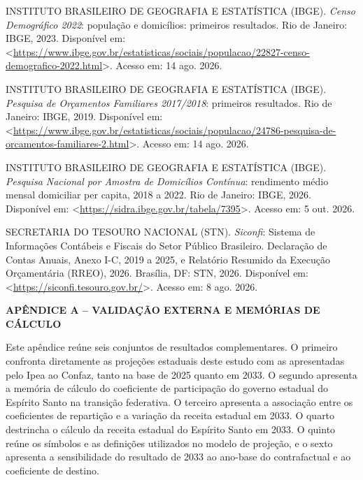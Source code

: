 \documentclass[12pt,a4paper]{article}
\renewcommand{\arraystretch}{1.15}
\newcommand{\tituloscentral}[1]{\par\vspace{18pt}\begin{center}\bfseries\MakeUppercase{#1}\end{center}\vspace{6pt}\nopagebreak}
\begin{document}
INSTITUTO BRASILEIRO DE GEOGRAFIA E ESTATÍSTICA (IBGE). \textit{Censo Demográfico 2022}: população e domicílios: primeiros resultados. Rio de Janeiro: IBGE, 2023. Disponível em: <\url{https://www.ibge.gov.br/estatisticas/sociais/populacao/22827-censo-demografico-2022.html}>. Acesso em: 14 ago. 2026.

INSTITUTO BRASILEIRO DE GEOGRAFIA E ESTATÍSTICA (IBGE). \textit{Pesquisa de Orçamentos Familiares 2017/2018}: primeiros resultados. Rio de Janeiro: IBGE, 2019. Disponível em: <\url{https://www.ibge.gov.br/estatisticas/sociais/populacao/24786-pesquisa-de-orcamentos-familiares-2.html}>. Acesso em: 14 ago. 2026.

INSTITUTO BRASILEIRO DE GEOGRAFIA E ESTATÍSTICA (IBGE). \textit{Pesquisa Nacional por Amostra de Domicílios Contínua}: rendimento médio mensal domiciliar per capita, 2018 a 2022. Rio de Janeiro: IBGE, 2026. Disponível em: <\url{https://sidra.ibge.gov.br/tabela/7395}>. Acesso em: 5 out. 2026.

SECRETARIA DO TESOURO NACIONAL (STN). \textit{Siconfi}: Sistema de Informações Contábeis e Fiscais do Setor Público Brasileiro. Declaração de Contas Anuais, Anexo I-C, 2019 a 2025, e Relatório Resumido da Execução Orçamentária (RREO), 2026. Brasília, DF: STN, 2026. Disponível em: <\url{https://siconfi.tesouro.gov.br/}>. Acesso em: 8 ago. 2026.
\endgroup

\clearpage
\appendix
\renewcommand{\arraystretch}{1.02}
\renewcommand{\thetable}{A.\arabic{table}}
\setcounter{table}{0}

\tituloscentral{Apêndice A -- Validação externa e memórias de cálculo}

Este apêndice reúne seis conjuntos de resultados complementares. O primeiro confronta diretamente as projeções estaduais deste estudo com as apresentadas pelo Ipea ao Confaz, tanto na base de 2025 quanto em 2033. O segundo apresenta a memória de cálculo do coeficiente de participação do governo estadual do Espírito Santo na transição federativa. O terceiro apresenta a associação entre os coeficientes de repartição e a variação da receita estadual em 2033. O quarto destrincha o cálculo da receita estadual do Espírito Santo em 2033. O quinto reúne os símbolos e as definições utilizados no modelo de projeção, e o sexto apresenta a sensibilidade do resultado de 2033 ao ano-base do contrafactual e ao coeficiente de destino.
\end{document}
